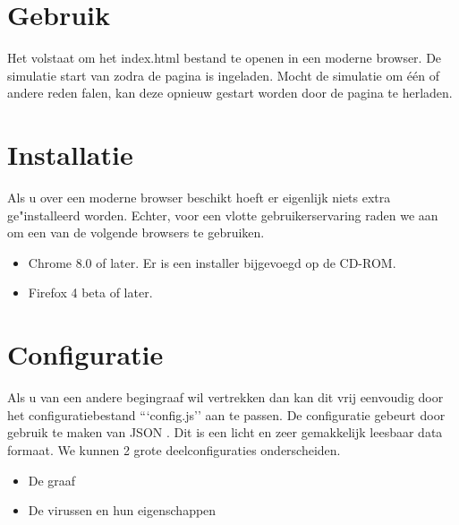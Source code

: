 \documentclass[a4paper,oneside]{report}
\begin{document}
\section{Gebruik}
Het volstaat om het index.html bestand te openen in een moderne browser. De simulatie start van zodra de pagina is ingeladen.
Mocht de simulatie om \'{e}\'{e}n of andere reden falen, kan deze opnieuw gestart worden door de pagina te herladen.
\section{Installatie}
Als u over een moderne browser beschikt hoeft er eigenlijk niets extra ge"installeerd worden.
Echter, voor een vlotte gebruikerservaring raden we aan om een van de volgende browsers te gebruiken.
\begin{itemize}
\item Chrome 8.0 of later. Er is een installer bijgevoegd op de CD-ROM.
\item Firefox 4 beta of later.
\end{itemize}
\pagebreak
\section{Configuratie}
Als u van een andere begingraaf wil vertrekken dan kan dit vrij eenvoudig door het configuratiebestand ```config.js'' aan te passen.
De configuratie gebeurt door gebruik te maken van JSON \cite{JSON}. Dit is een licht en zeer gemakkelijk leesbaar data formaat.
We kunnen 2 grote deelconfiguraties onderscheiden.
\begin{itemize}
    \item De graaf
    \item De virussen en hun eigenschappen
\end{itemize}
\end{document}
